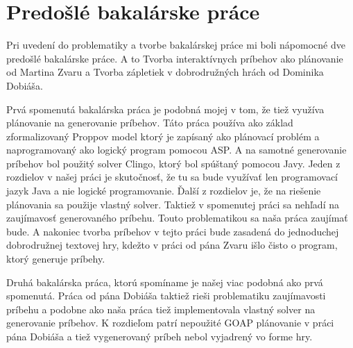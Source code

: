 \section{Predošlé bakalárske práce}
Pri uvedení do problematiky a tvorbe bakalárskej práce mi boli nápomocné dve predošlé bakalárske práce. A to Tvorba interaktívnych príbehov ako plánovanie od Martina Zvaru a Tvorba zápletiek v dobrodružných hrách od Dominika Dobiáša.\par
Prvá spomenutá bakalárska práca je podobná mojej v tom, že tiež využíva plánovanie na generovanie príbehov. Táto práca používa ako základ zformalizovaný Proppov model ktorý je zapísaný ako plánovací problém a naprogramovaný ako logický program pomocou ASP. A na samotné generovanie príbehov bol použitý solver Clingo, ktorý bol spúštaný pomocou Javy. Jeden z rozdielov v našej práci je skutočnosť, že tu sa bude využívať len programovací jazyk Java a nie logické programovanie. Ďalší z rozdielov je, že na riešenie plánovania sa použije vlastný solver. Taktiež v spomenutej práci sa nehľadí na zaujímavosť generovaného príbehu. Touto problematikou sa naša práca zaujímať bude. A nakoniec tvorba príbehov v tejto práci bude zasadená do jednoduchej dobrodružnej textovej hry, kdežto v práci od pána Zvaru išlo čisto o program, ktorý generuje príbehy.\par
Druhá bakalárska práca, ktorú spomíname je našej viac podobná ako prvá spomenutá. Práca od pána Dobiáša taktiež rieši problematiku zaujímavosti príbehu a podobne ako naša práca tiež implementovala vlastný solver na generovanie príbehov. K rozdieľom patrí nepoužité GOAP plánovanie v práci pána Dobiáša a tiež vygenerovaný príbeh nebol vyjadrený vo forme hry.